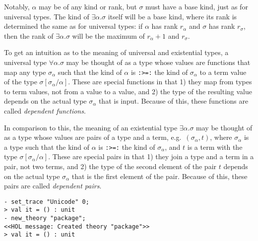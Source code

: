 Notably, $\alpha$ may be of any kind or rank, but $\sigma$ must have a
base kind, just as for universal types.
The kind of $\exists\alpha.\sigma$ itself will be a base kind, where its
rank is determined the same as for universal types:
if $\alpha$ has rank $r_\alpha$ and $\sigma$ has rank $r_\sigma$, then
the rank of $\exists\alpha.\sigma$ will be the maximum of $r_\alpha + 1$
and $r_\sigma$.

To get an intuition as to the meaning of universal and existential types,
a universal type $\forall\alpha.\sigma$
may be thought of as 
a type whose values are
functions that map any type $\sigma_\alpha$ 
such that
the kind of $\alpha$ is \texttt{:>=:} the kind of $\sigma_\alpha$
to a term value of the type $\sigma[\sigma_\alpha / \alpha]$.
These are special functions in that 
1) they map from types to term values, not from a value to a value, and
2) the type of the resulting value
depends on the actual type $\sigma_\alpha$ that is input.
Because of this, these functions are called {\it dependent functions}.

In comparison to this, the meaning of an existential type 
$\exists\alpha.\sigma$
may be thought of as 
a type whose values are
pairs of a type and a term, 
e.g.~$(\sigma_\alpha, t)$,
where $\sigma_\alpha$ is a type
such that
the kind of $\alpha$ is \texttt{:>=:} the kind of $\sigma_\alpha$,
and 
$t$ is a term with the type $\sigma[\sigma_\alpha / \alpha]$.
These are special pairs in that 
1) they join a type and a term in a pair, not two terms, and
2) the type of the second element of the pair $t$
depends on the actual type $\sigma_\alpha$ that is the first element
of the pair.
Because of this, these pairs are called {\it dependent pairs}.
\setcounter{sessioncount}{0}
\begin{session}
\begin{verbatim}
- set_trace "Unicode" 0;
> val it = () : unit
- new_theory "package";
<<HOL message: Created theory "package">>
> val it = () : unit
\end{verbatim}
\end{session}

